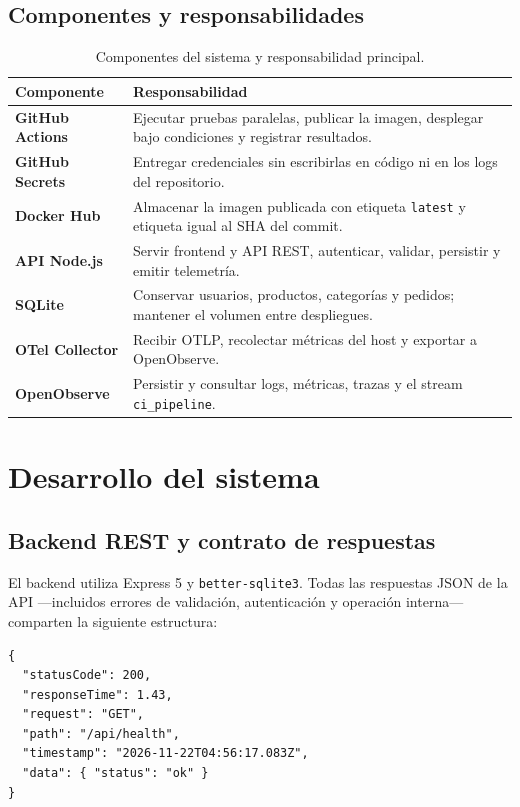 \documentclass[12pt,a4paper]{article}
\begin{document}
\subsection{Componentes y responsabilidades}

\begin{table}[H]
  \centering
  \caption{Componentes del sistema y responsabilidad principal.}
  \begin{tabularx}{\textwidth}{>{\bfseries}p{3.2cm} X}
    \toprule
    Componente & Responsabilidad \\
    \midrule
    GitHub Actions & Ejecutar pruebas paralelas, publicar la imagen, desplegar bajo condiciones y registrar resultados. \\
    GitHub Secrets & Entregar credenciales sin escribirlas en código ni en los logs del repositorio. \\
    Docker Hub & Almacenar la imagen publicada con etiqueta \texttt{latest} y etiqueta igual al SHA del commit. \\
    API Node.js & Servir frontend y API REST, autenticar, validar, persistir y emitir telemetría. \\
    SQLite & Conservar usuarios, productos, categorías y pedidos; mantener el volumen entre despliegues. \\
    OTel Collector & Recibir OTLP, recolectar métricas del host y exportar a OpenObserve. \\
    OpenObserve & Persistir y consultar logs, métricas, trazas y el stream \texttt{ci\_pipeline}. \\
    \bottomrule
  \end{tabularx}
\end{table}

\section{Desarrollo del sistema}

\subsection{Backend REST y contrato de respuestas}

El backend utiliza Express 5 y \texttt{better-sqlite3}. Todas las respuestas JSON de la API ---incluidos errores de validación, autenticación y operación interna--- comparten la siguiente estructura:

\begin{lstlisting}[style=code]
{
  "statusCode": 200,
  "responseTime": 1.43,
  "request": "GET",
  "path": "/api/health",
  "timestamp": "2026-11-22T04:56:17.083Z",
  "data": { "status": "ok" }
}
\end{lstlisting}
\end{document}
